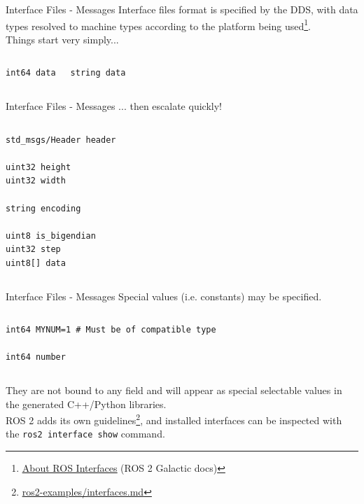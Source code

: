 \begin{frame}[fragile]{Interface Files - Messages}
Interface files format is specified by the DDS, with data types resolved to machine types according to the platform being used\footnote{\href{https://docs.ros.org/en/galactic/Concepts/About-ROS-Interfaces.html}{\color{blue}\underline{About ROS Interfaces}} (ROS 2 Galactic docs)}.\\
Things start very simply...

\begin{columns}
\begin{lstlisting}[language=ros2msg, caption=Definition of the \texttt{std\_msgs/msg/Int64} message]
int64 data
\end{lstlisting}

\begin{lstlisting}[language=ros2msg, caption=Definition of the \texttt{std\_msgs/msg/String} message]
string data
\end{lstlisting}
\end{columns}

\end{frame}
\begin{frame}[fragile]{Interface Files - Messages}
... then escalate quickly!

\begin{columns}
\begin{lstlisting}[language=ros2msg, caption=Definition of the \texttt{sensor\_msgs/msg/Image} composite message]
std_msgs/Header header

uint32 height
uint32 width

string encoding

uint8 is_bigendian
uint32 step
uint8[] data
\end{lstlisting}
\end{columns}

\end{frame}
\begin{frame}[fragile]{Interface Files - Messages}
Special values (i.e. constants) may be specified.

\begin{columns}
\begin{lstlisting}[language=ros2msg, caption=Definition of an example message with a constant value]
int64 MYNUM=1 # Must be of compatible type

int64 number
\end{lstlisting}
\end{columns}

They are not bound to any field and will appear as special selectable values in the generated C++/Python libraries.\\
ROS 2 adds its own guidelines\footnote{\href{https://github.com/IntelligentSystemsLabUTV/ros2-examples/blob/galactic/interfaces.md}{\color{blue}\underline{ros2-examples/interfaces.md}}}, and installed interfaces can be inspected with the \texttt{ros2 interface show} command.
\end{frame}

